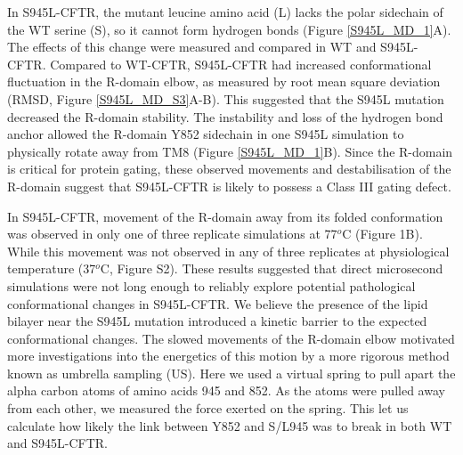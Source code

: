 In S945L-CFTR, the mutant leucine amino acid (L) lacks the polar sidechain of the WT serine (S), so it cannot form hydrogen bonds (Figure \ref{S945L_MD_1}A). The effects of this change were measured and compared in WT and S945L-CFTR. Compared to WT-CFTR, S945L-CFTR had increased conformational fluctuation in the R-domain elbow, as measured by root mean square deviation (RMSD, Figure \ref{S945L_MD_S3}A-B). This suggested that the S945L mutation decreased the R-domain stability. The instability and loss of the hydrogen bond anchor allowed the R-domain Y852 sidechain in one S945L simulation to physically rotate away from TM8 (Figure \ref{S945L_MD_1}B). Since the R-domain is critical for protein gating, these observed movements and destabilisation of the R-domain suggest that S945L-CFTR is likely to possess a Class III gating defect.

In S945L-CFTR, movement of the R-domain away from its folded conformation was observed in only one of three replicate simulations at 77$^o$C (Figure 1B). While this movement was not observed in any of three replicates at physiological temperature (37$^o$C, Figure S2). These results suggested that direct microsecond simulations were not long enough to reliably explore potential pathological conformational changes in S945L-CFTR. We believe the presence of the lipid bilayer near the S945L mutation introduced a kinetic barrier to the expected conformational changes. The slowed movements of the R-domain elbow motivated more investigations into the energetics of this motion by a more rigorous method known as umbrella sampling (US). Here we used a virtual spring to pull apart the alpha carbon atoms of amino acids 945 and 852. As the atoms were pulled away from each other, we measured the force exerted on the spring. This let us calculate how likely the link between Y852 and S/L945 was to break in both WT and S945L-CFTR.

